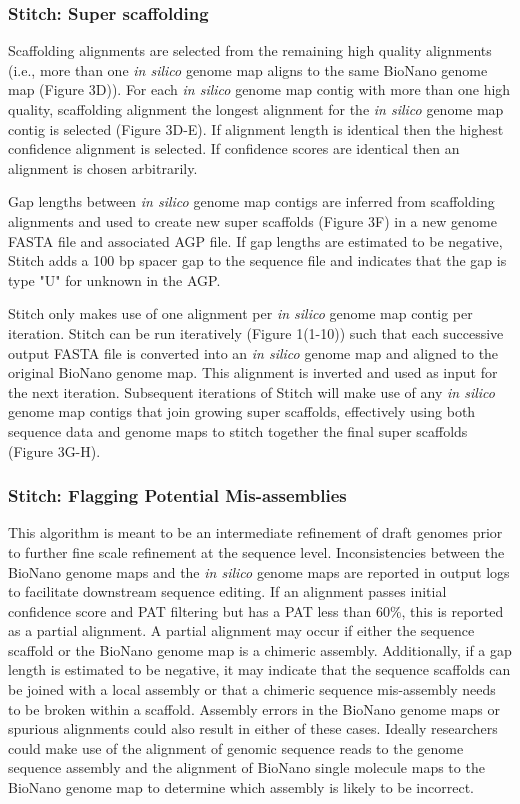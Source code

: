 \documentclass{bmcart}
\begin{document}
\subsubsection*{Stitch: Super scaffolding}

Scaffolding alignments are selected from the remaining high quality alignments (i.e., more than one \textit{in silico} genome map aligns to the same BioNano genome map (Figure 3D)). For each \textit{in silico} genome map contig with more than one high quality, scaffolding alignment the longest alignment for the \textit{in silico} genome map contig is selected (Figure 3D-E). If alignment length is identical then the highest confidence alignment is selected. If confidence scores are identical then an alignment is chosen arbitrarily.

Gap lengths between \textit{in silico} genome map contigs are inferred from scaffolding alignments and used to create new super scaffolds (Figure 3F) in a new genome FASTA file and associated AGP file. If gap lengths are estimated to be negative, Stitch adds a 100 bp spacer gap to the sequence file and indicates that the gap is type "U" for unknown in the AGP. 

Stitch only makes use of one alignment per \textit{in silico} genome map contig per iteration. Stitch can be run iteratively (Figure 1(1-10)) such that each successive output FASTA file is converted into an \textit{in silico} genome map and aligned to the original BioNano genome map. This alignment is inverted and used as input for the next iteration. Subsequent iterations of Stitch will make use of any \textit{in silico} genome map contigs that join growing super scaffolds, effectively using both sequence data and genome maps to stitch together the final super scaffolds (Figure 3G-H). 

\subsubsection*{Stitch: Flagging Potential Mis-assemblies}

This algorithm is meant to be an intermediate refinement of draft genomes prior to further fine scale refinement at the sequence level. Inconsistencies between the BioNano genome maps and the \textit{in silico} genome maps are reported in output logs to facilitate downstream sequence editing. If an alignment passes initial confidence score and PAT filtering but has a PAT less than 60\%, this is reported as a partial alignment. A partial alignment may occur if either the sequence scaffold or the BioNano genome map is a chimeric assembly. Additionally, if a gap length is estimated to be negative, it may indicate that the sequence scaffolds can be joined with a local assembly or that a chimeric sequence mis-assembly needs to be broken within a scaffold. Assembly errors in the BioNano genome maps or spurious alignments could also result in either of these cases. Ideally researchers could make use of the alignment of genomic sequence reads to the genome sequence assembly and the alignment of BioNano single molecule maps to the BioNano genome map to determine which assembly is likely to be incorrect.
 
\end{document}
